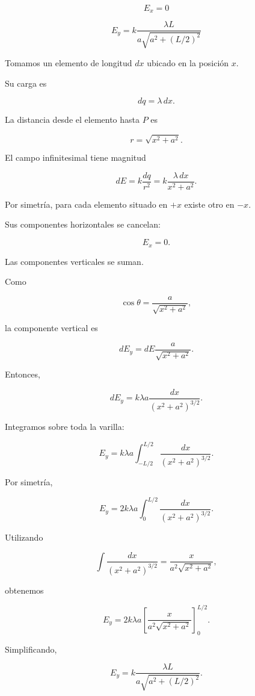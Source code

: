 \begin{respuesta}

\[
\boxed{E_x=0}
\]

\[
\boxed{
E_y=
k\frac{\lambda L}
{a\sqrt{a^2+(L/2)^2}}
}
\]

\end{respuesta}

\begin{explicacion}

Tomamos un elemento de longitud \(dx\) ubicado en la posición \(x\).

Su carga es

\[
dq=\lambda\,dx.
\]

La distancia desde el elemento hasta \(P\) es

\[
r=\sqrt{x^2+a^2}.
\]

El campo infinitesimal tiene magnitud

\[
dE=k\frac{dq}{r^2}
=k\frac{\lambda\,dx}{x^2+a^2}.
\]

Por simetría, para cada elemento situado en \(+x\) existe otro en \(-x\).

Sus componentes horizontales se cancelan:

\[
\boxed{E_x=0}.
\]

Las componentes verticales se suman.

Como

\[
\cos\theta=\frac{a}{\sqrt{x^2+a^2}},
\]

la componente vertical es

\[
dE_y=dE\frac{a}{\sqrt{x^2+a^2}}.
\]

Entonces,

\[
dE_y=
k\lambda a
\frac{dx}{(x^2+a^2)^{3/2}}.
\]

Integramos sobre toda la varilla:

\[
E_y=
k\lambda a
\int_{-L/2}^{L/2}
\frac{dx}{(x^2+a^2)^{3/2}}.
\]

Por simetría,

\[
E_y=
2k\lambda a
\int_0^{L/2}
\frac{dx}{(x^2+a^2)^{3/2}}.
\]

Utilizando

\[
\int\frac{dx}{(x^2+a^2)^{3/2}}
=
\frac{x}{a^2\sqrt{x^2+a^2}},
\]

obtenemos

\[
E_y=
2k\lambda a
\left[
\frac{x}{a^2\sqrt{x^2+a^2}}
\right]_0^{L/2}.
\]

Simplificando,

\[
\boxed{
E_y=
k\frac{\lambda L}
{a\sqrt{a^2+(L/2)^2}}
}.
\]

\end{explicacion}


